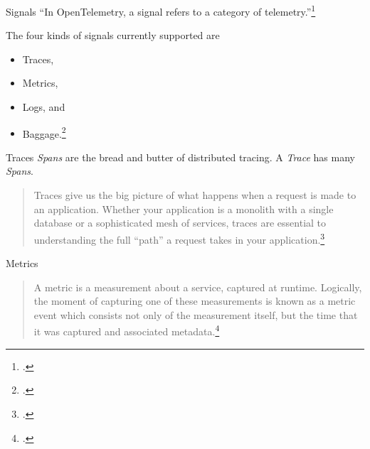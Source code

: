 \documentclass[aspectratio=169]{beamer}
\begin{document}
\begin{frame}{Signals}
  ``In OpenTelemetry, a signal refers to a category of telemetry.''\footcite{otel-signals}

  \vspace{1em}

  The four kinds of signals currently supported are

  \begin{itemize}
    \item Traces,
    \item Metrics,
    \item Logs, and
    \item Baggage.\footcite{otel-signals}
  \end{itemize}
\end{frame}

\begin{frame}{Traces}
  \emph{Spans} are the bread and butter of distributed tracing. A \emph{Trace}
  has many \emph{Spans}.

  \vspace{1em}

  \begin{quote}
    Traces give us the big picture of what happens when a request is made to an
    application. Whether your application is a monolith with a single database
    or a sophisticated mesh of services, traces are essential to understanding
    the full ``path'' a request takes in your application.\footcite{otel-traces}
  \end{quote}
\end{frame}

\begin{frame}{Metrics}

  \begin{quote}

    A metric is a measurement about a service, captured at runtime. Logically,
    the moment of capturing one of these measurements is known as a metric event
    which consists not only of the measurement itself, but the time that it was
    captured and associated metadata.\footcite{otel-metrics}

  \end{quote}
\end{frame}
\end{document}
